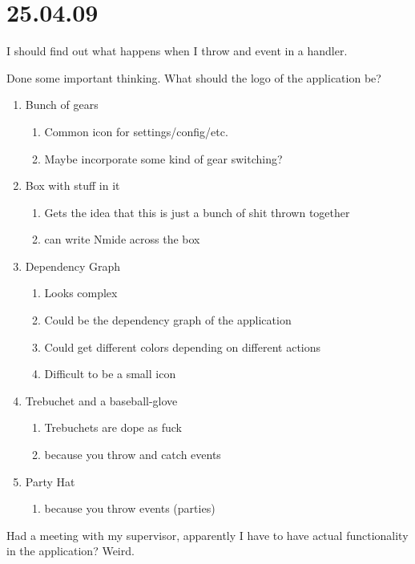 \section{25.04.09}

I should find out what happens when I throw and event in a handler.

Done some important thinking. What should the logo of the application be?

\begin{enumerate}
  \item Bunch of gears
  \begin{enumerate}
    \item Common icon for settings/config/etc.
    \item Maybe incorporate some kind of gear switching?
  \end{enumerate}
  \item Box with stuff in it
  \begin{enumerate}
    \item Gets the idea that this is just a bunch of shit thrown together
    \item can write Nmide across the box
  \end{enumerate}
  \item Dependency Graph
  \begin{enumerate}
    \item Looks complex
    \item Could be the dependency graph of the application
    \item Could get different colors depending on different actions
    \item Difficult to be a small icon
  \end{enumerate}
  \item Trebuchet and a baseball-glove
  \begin{enumerate}
    \item Trebuchets are dope as fuck
    \item because you throw and catch events
  \end{enumerate}
  \item Party Hat
  \begin{enumerate}
    \item because you throw events (parties)
  \end{enumerate}
\end{enumerate}

Had a meeting with my supervisor, apparently I have to have actual functionality
in the application? Weird.

